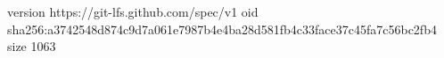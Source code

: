 version https://git-lfs.github.com/spec/v1
oid sha256:a3742548d874c9d7a061e7987b4e4ba28d581fb4c33face37c45fa7c56bc2fb4
size 1063
